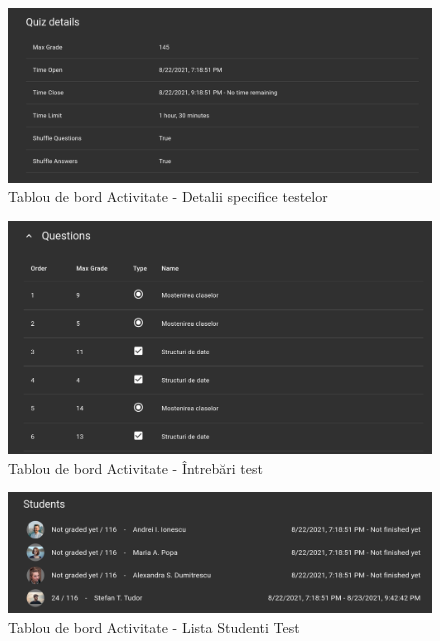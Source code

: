 \documentclass[12pt, a4paper, oneside, romanian]{teza-upb}
\begin{document}
\begin{figure}[H]
\centering
\includegraphics*[width=\columnwidth]{tablou-de-bord-activitate-detalii-specifice-testelor}
\caption{Tablou de bord Activitate - Detalii specifice testelor}
\label{tablou-de-bord-activitate-detalii-specifice-testelor}
\end{figure}

\begin{figure}[H]
\centering
\includegraphics*[width=\columnwidth]{tablou-de-bord-activitate-intrebari-test}
\caption{Tablou de bord Activitate - Întrebări test}
\label{tablou-de-bord-activitate-intrebari-test}
\end{figure}

\begin{figure}[H]
\centering
\includegraphics*[width=\columnwidth]{tablou-de-bord-activitate-lista-studenti-test}
\caption{Tablou de bord Activitate - Lista Studenti Test}
\label{tablou-de-bord-activitate-lista-studenti-test}
\end{figure}
\end{document}
